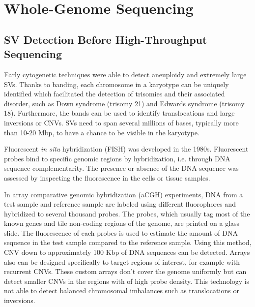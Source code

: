 \section{Whole-Genome Sequencing}

\subsection{SV Detection Before High-Throughput Sequencing}
\label{sec:prehts}

Early cytogenetic techniques were able to detect aneuploidy and extremely large SVs.
Thanks to banding, each chromosome in a karyotype can be uniquely identified which facilitated the detection of trisomies and their associated disorder, such as Down syndrome (trisomy 21) and Edwards syndrome (trisomy 18).
Furthermore, the bands can be used to identify translocations and large inversions or CNVs.
SVs need to span several millions of bases, typically more than 10-20 Mbp, to have a chance to be visible in the karyotype.

Fluorescent {\it in situ} hybridization (FISH) was developed in the 1980s.
Fluorescent probes bind to specific genomic regions by hybridization, i.e. through DNA sequence complementarity.
The presence or absence of the DNA sequence was assessed by inspecting the fluorescence in the cells or tissue samples.

In array comparative genomic hybridization (aCGH) experiments, DNA from a test sample and reference sample are labeled using different fluorophores and hybridized to several thousand probes.
The probes, which usually tag most of the known genes and tile non-coding regions of the genome, are printed on a glass slide.
The fluorescence of each probes is used to estimate the amount of DNA sequence in the test sample compared to the reference sample.
Using this method, CNV down to approximately 100 Kbp of DNA sequences can be detected.
Arrays also can be designed specifically to target regions of interest, for example with recurrent CNVs.
These custom arrays don't cover the genome uniformly but can detect smaller CNVs in the regions with of high probe density.
This technology is not able to detect balanced chromosomal imbalances such as translocations or inversions.


